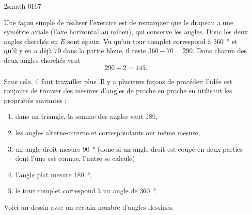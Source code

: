 
\begin{corrige}{2smath-0167}

    Une façon simple de réaliser l'exercice est de remarquer que le drapeau a une symétrie axiale (l'axe horizontal au milieu), qui conserve les angles. Donc les deux angles cherchés en $E$ sont égaux. Vu qu'un tour complet correspond à \SI{360}{\degree} et qu'il y en a déjà \( 70\) dans la partie bleue, il reste \( 360-70=290\). Donc chacun des deux angles cherchés vaut
    \begin{equation}
        290\div 2=145.
    \end{equation}
    
    Sans cela, il faut travailler plus. Il y a plusieurs façons de procéder; l'idée est toujours de trouver des mesures d'angles de proche en proche en utilisant les propriétés suivantes :
    \begin{enumerate}
        \item
            dans un triangle, la somme des angles vaut \( 180\),
        \item
            les angles alterne-interne et correspondants ont même mesure,
        \item
            un angle droit mesure \SI{90}{\degree} (donc si un angle droit est coupé en deux parties dont l'une est connue, l'autre se calcule)
        \item
            l'angle plat mesure \SI{180}{\degree},
        \item
            le tour complet correspond à un angle de \SI{360}{\degree}.
    \end{enumerate}

    Voici un dessin avec un certain nombre d'angles dessinés.


\end{corrige}

